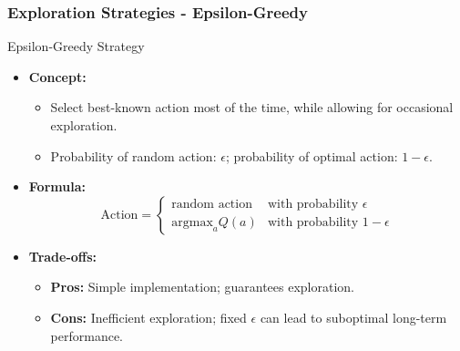 \documentclass{beamer}
\begin{document}
\begin{frame}[fragile]
    \frametitle{Exploration Strategies - Epsilon-Greedy}
    \begin{block}{Epsilon-Greedy Strategy}
        \begin{itemize}
            \item \textbf{Concept:} 
            \begin{itemize}
                \item Select best-known action most of the time, while allowing for occasional exploration.
                \item Probability of random action: $\epsilon$; probability of optimal action: $1 - \epsilon$.
            \end{itemize}
            \item \textbf{Formula:}
            \begin{equation}
                \text{Action} = 
                \begin{cases} 
                \text{random action} & \text{with probability } \epsilon \\ 
                \text{argmax}_a Q(a) & \text{with probability } 1 - \epsilon 
                \end{cases}
            \end{equation}
            \item \textbf{Trade-offs:}
            \begin{itemize}
                \item \textbf{Pros:} Simple implementation; guarantees exploration.
                \item \textbf{Cons:} Inefficient exploration; fixed $\epsilon$ can lead to suboptimal long-term performance.
            \end{itemize}
        \end{itemize}
    \end{block}
\end{frame}
\end{document}
